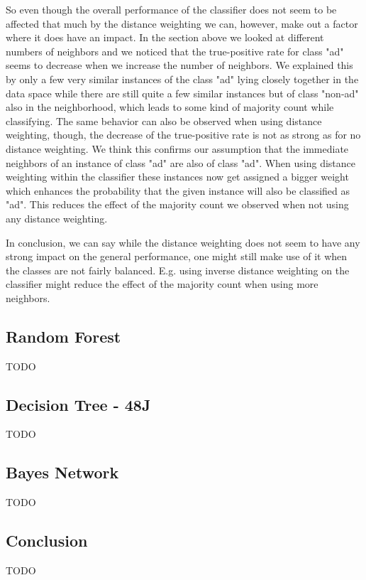 \documentclass{article}
\begin{document}
So even though the overall performance of the classifier does not seem to be affected that much by the distance weighting we can, however, make out a factor where it does have an impact. In the section above we looked at different numbers of neighbors and we noticed that the true-positive rate for class "ad" seems to decrease when we increase the number of neighbors. We explained this by only a few very similar instances of the class "ad" lying closely together in the data space while there are still quite a few similar instances but of class "non-ad" also in the neighborhood, which leads to some kind of majority count while classifying. The same behavior can also be observed when using distance weighting, though, the decrease of the true-positive rate is not as strong as for no distance weighting. We think this confirms our assumption that the immediate neighbors of an instance of class "ad" are also of class "ad". When using distance weighting within the classifier these instances now get assigned a bigger weight which enhances the probability that the given instance will also be classified as "ad". This reduces the effect of the majority count we observed when not using any distance weighting.

In conclusion, we can say while the distance weighting does not seem to have any strong impact on the general performance, one might still make use of it when the classes are not fairly balanced. E.g. using inverse distance weighting on the classifier might reduce the effect of the majority count when using more neighbors.


\subsection{Random Forest}
TODO\\
\subsection{Decision Tree - 48J}
TODO\\
\subsection{Bayes Network}
TODO\\
\subsection{Conclusion}
TODO\\
\end{document}
